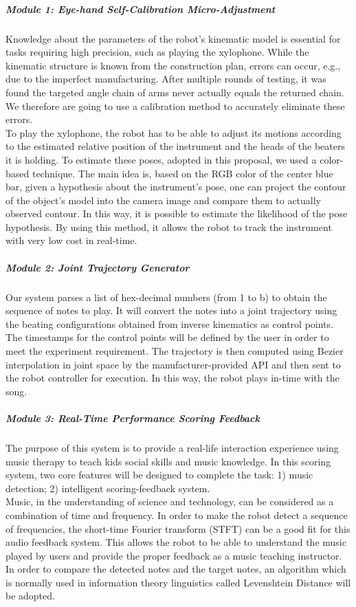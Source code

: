 \documentclass[12pt]{report}
\begin{document}
\subparagraph{Module 1: Eye-hand Self-Calibration Micro-Adjustment}
Knowledge about the parameters of the robot's kinematic model is essential for 
tasks requiring high precision, such as playing the xylophone. While the kinematic 
structure is known from the construction plan, errors can occur, e.g., due to the 
imperfect manufacturing. After multiple rounds of testing, it was found the targeted angle chain 
of arms never actually equals the returned chain. We therefore are going to use a 
calibration method to accurately eliminate these errors.\\

To play the xylophone, the robot has to be able to adjust its motions according to
the estimated relative position of the instrument and the heads of the beaters it is 
holding. To estimate these poses, adopted in this proposal, we used a color-based technique.
The main idea is, based on the RGB color of the center blue bar, given a hypothesis 
about the instrument's pose, one can project the contour of the object's model into the 
camera image and compare them to actually observed contour. In this way, it is possible 
to estimate the likelihood of the pose hypothesis. By using this method, it allows
the robot to track the instrument with very low cost in real-time. \\

\subparagraph{Module 2: Joint Trajectory Generator}
Our system parses a list of hex-decimal numbers (from 1 to b) to obtain the sequence
of notes to play. It will convert the notes into a joint trajectory using the beating
configurations obtained from inverse kinematics as control points. The timestamps
for the control points will be defined by the user in order to meet the experiment requirement.
The trajectory is then computed using Bezier interpolation in joint space by the
manufacturer-provided API and then sent to the robot controller for execution. In this
way, the robot plays in-time with the song.\\

\subparagraph{Module 3: Real-Time Performance Scoring Feedback}
The purpose of this system is to provide a real-life interaction experience using 
music therapy to teach kids social skills and music knowledge.  In this scoring 
system, two core features will be designed to complete the task: 1) music detection;
2) intelligent scoring-feedback system.\\

Music, in the understanding of science and technology, can be considered as a combination 
of time and frequency. In order to make the robot detect a sequence of frequencies, the 
short-time Fourier transform (STFT) can be a good fit for this audio feedback system. This allows the robot to 
be able to understand the music played by users and provide the proper feedback as
a music teaching instructor. In order to compare the detected notes and the target notes, an algorithm
which is normally used in information theory linguistics called Levenshtein Distance will be adopted.\\
\end{document}
